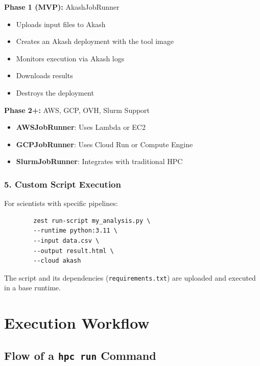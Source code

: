\documentclass[11pt,a4paper]{article}
\begin{document}
	\textbf{Phase 1 (MVP):} AkashJobRunner
	\begin{itemize}
		\item Uploads input files to Akash
		\item Creates an Akash deployment with the tool image
		\item Monitors execution via Akash logs
		\item Downloads results
		\item Destroys the deployment
	\end{itemize}
	
	\textbf{Phase 2+:} AWS, GCP, OVH, Slurm Support
	\begin{itemize}
		\item \textbf{AWSJobRunner}: Uses Lambda or EC2
		\item \textbf{GCPJobRunner}: Uses Cloud Run or Compute Engine
		\item \textbf{SlurmJobRunner}: Integrates with traditional HPC
	\end{itemize}
	
	\subsubsection{5. Custom Script Execution}
	
	For scientists with specific pipelines:
	
	\begin{lstlisting}
		zest run-script my_analysis.py \
		--runtime python:3.11 \
		--input data.csv \
		--output result.html \
		--cloud akash
	\end{lstlisting}
	
	The script and its dependencies (\texttt{requirements.txt}) are uploaded and executed in a base runtime.
	
	\newpage
	
	\section{Execution Workflow}
	
	\subsection{Flow of a \texttt{hpc run} Command}
	
\end{document}
